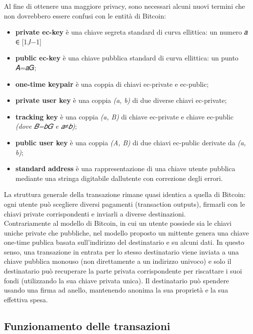 \documentclass[
]{article}
\begin{document}
Al fine di ottenere una maggiore privacy, sono necessari alcuni nuovi
termini che non dovrebbero essere confusi con le entità di Bitcoin:

\begin{itemize}
\item
  \textbf{private ec-key} è una chiave segreta standard di curva
  ellittica: un numero 𝑎 ∈ {[}1,𝑙−1{]}
\item
  \textbf{public ec-key} è una chiave pubblica standard di curva
  ellittica: un punto 𝐴=𝑎𝐺;
\item
  \textbf{one-time keypair} è una coppia di chiavi ec-private e
  ec-public;
\item
  \textbf{private user key} è una coppia \emph{(a, b)} di due diverse
  chiavi ec-private;
\item
  \textbf{tracking key} è una coppia \emph{(a, B)} di chiave ec-private
  e chiave ec-public \emph{(dove 𝐵=𝑏𝐺 e 𝑎≠𝑏)};
\item
  \textbf{public user key} è una coppia \emph{(A, B)} di due chiavi
  ec-public derivate da \emph{(a, b)};
\item
  \textbf{standard} \textbf{address} è una rappresentazione di una
  chiave utente pubblica mediante una stringa digitabile
  dall\textquotesingle utente con correzione degli errori.
\end{itemize}

La struttura generale della transazione rimane quasi identica a quella
di Bitcoin: ogni utente può scegliere diversi pagamenti (transaction
outputs), firmarli con le chiavi private corrispondenti e inviarli a
diverse destinazioni.\\
Contrariamente al modello di Bitcoin, in cui un utente possiede sia le
chiavi uniche private che pubbliche, nel modello proposto un mittente
genera una chiave one-time publica basata sull'indirizzo del
destinatario e su alcuni dati. In questo senso, una transazione in
entrata per lo stesso destinatario viene inviata a una chiave pubblica
monouso (non direttamente a un indirizzo univoco) e solo il destinatario
può recuperare la parte privata corrispondente per riscattare i suoi
fondi (utilizzando la sua chiave privata unica). Il destinatario può
spendere usando una firma ad anello, mantenendo anonima la sua proprietà
e la sua effettiva spesa.

\subsection{Funzionamento delle
transazioni}\label{funzionamento-delle-transazioni}
\end{document}
